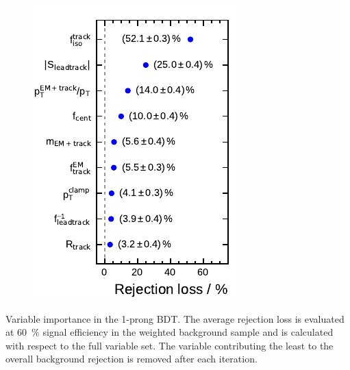 \begin{minipage}{\textwidth}
\begin{subfigure}[t]{0.33\textwidth}
    \includegraphics{./figures/bdt_perf/var_importance/1p_iter2.pdf}
  \end{subfigure}
  \caption[Recursive feature elimination for the 1-prong BDT]{Variable
    importance in the 1-prong BDT. The average rejection loss is evaluated at
    \SI{60}{\percent} signal efficiency in the weighted background sample and is
    calculated with respect to the full variable set. The variable contributing
    the least to the overall background rejection is removed after each
    iteration.}
  \label{fig:variable_importance_1p_app}
\end{minipage}

